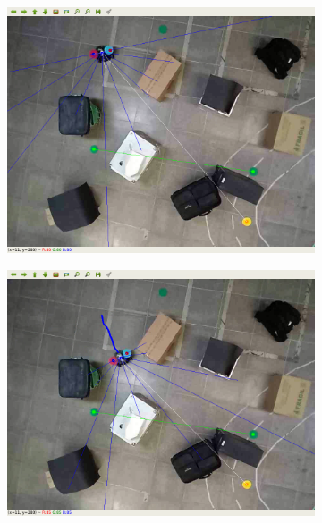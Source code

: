 \begin{figure}[htbp]
    \centering
    \begin{subfigure}[b]{0.115\textwidth}
        \includegraphics[width=\textwidth]{images/test_env2/1.png}
    \end{subfigure}
    \hfill
    \begin{subfigure}[b]{0.115\textwidth}
        \includegraphics[width=\textwidth]{images/test_env2/2.png}
    \end{subfigure}
    \hfill
    \begin{subfigure}[b]{0.115\textwidth}

\end{subfigure}
\end{figure}

